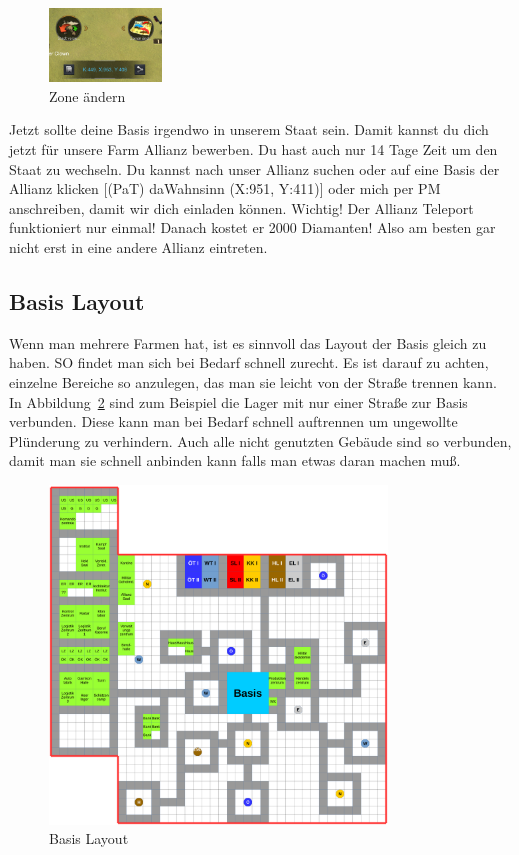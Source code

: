 \documentclass[fontsize=12pt,a4paper]{scrartcl}[2003/01/01]
\begin{document}
\begin{figure}[H] 
  \centering
     \includegraphics[width=3cm]{Bilder/IMG_E0005.JPG}
  \caption{Zone ändern}
  \label{fig:zone}
\end{figure}

Jetzt sollte deine Basis irgendwo in unserem Staat sein. Damit kannst du dich jetzt für unsere Farm Allianz bewerben.
Du hast auch nur 14 Tage Zeit um den Staat zu wechseln.
Du kannst nach unser Allianz suchen oder auf eine Basis der Allianz klicken [(PaT) daWahnsinn (X:951, Y:411)] oder mich per PM anschreiben,
damit wir dich einladen können.
Wichtig! Der Allianz Teleport funktioniert nur einmal! Danach kostet er 2000 Diamanten! Also am besten gar nicht erst in eine
andere Allianz eintreten.

\subsection{Basis Layout}

Wenn man mehrere Farmen hat, ist es sinnvoll das Layout der Basis gleich zu haben. SO findet man sich bei Bedarf schnell zurecht.
Es ist darauf zu achten, einzelne Bereiche so anzulegen, das man sie leicht von der Straße trennen kann. In Abbildung~\ref{fig:map}
sind zum Beispiel die Lager mit nur einer Straße zur Basis verbunden. Diese kann man bei Bedarf schnell auftrennen um ungewollte Plünderung
zu verhindern. Auch alle nicht genutzten Gebäude sind so verbunden, damit man sie schnell anbinden kann falls man etwas daran machen muß.

\begin{figure}[H] 
  \centering
     \includegraphics[width=0.8\textwidth]{Bilder/map.png}
  \caption{Basis Layout}
  \label{fig:map}
\end{figure}
\end{document}
